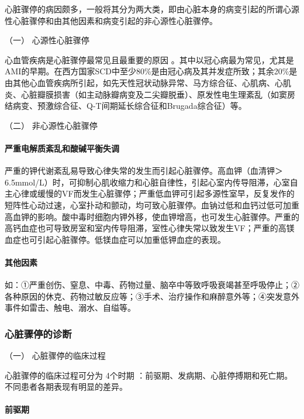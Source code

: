 心脏骤停的病因颇多，一般将其分为两大类，即由心脏本身的病变引起的所谓心源性心脏骤停和由其他因素和病变引起的非心源性心脏骤停。

\hypertarget{text00281.htmlux5cux23CHP10-1-2-1-1}{}
（一） 心源性心脏骤停

心血管疾病是心脏骤停最常见且最重要的原因
。其中以冠心病最为常见，尤其是AMI的早期。在西方国家SCD中至少80\%是由冠心病及其并发症所致；其余20\%是由其他心血管疾病所引起，如先天性冠状动脉异常、马方综合征、心肌病、心肌炎、心脏瓣膜损害（如主动脉瓣病变及二尖瓣脱垂）、原发性电生理紊乱（如窦房结病变、预激综合征、Q-T间期延长综合征和Brugada综合征）等。

\hypertarget{text00281.htmlux5cux23CHP10-1-2-1-2}{}
（二） 非心源性心脏骤停

\paragraph{严重电解质紊乱和酸碱平衡失调}

严重的钾代谢紊乱易导致心律失常的发生而引起心脏骤停。高血钾（血清钾＞
6.5mmol/L）时，可抑制心肌收缩力和心脏自律性，引起心室内传导阻滞，心室自主心律或缓慢的VF而发生心脏骤停；严重低血钾可引起多源性室早，反复发作的短阵性心动过速，心室扑动和颤动，均可致心脏骤停。血钠过低和血钙过低可加重高血钾的影响。酸中毒时细胞内钾外移，使血钾增高，也可发生心脏骤停。严重的高钙血症也可导致房室和室内传导阻滞，室性心律失常以致发生VF；严重的高镁血症也可引起心脏骤停。低镁血症可以加重低钾血症的表现。

\paragraph{其他因素}

如：①严重创伤、窒息、中毒、药物过量、脑卒中等致呼吸衰竭甚至呼吸停止；②各种原因的休克、药物过敏反应等；③手术、治疗操作和麻醉意外等；④突发意外事件如雷击、触电、溺水、自缢等。

\subsubsection{心脏骤停的诊断}

\hypertarget{text00281.htmlux5cux23CHP10-1-2-2-1}{}
（一） 心脏骤停的临床过程

心脏骤停的临床过程可分为 4个时期
：前驱期、发病期、心脏停搏期和死亡期。不同患者各期表现有明显的差异。

\paragraph{前驱期}

